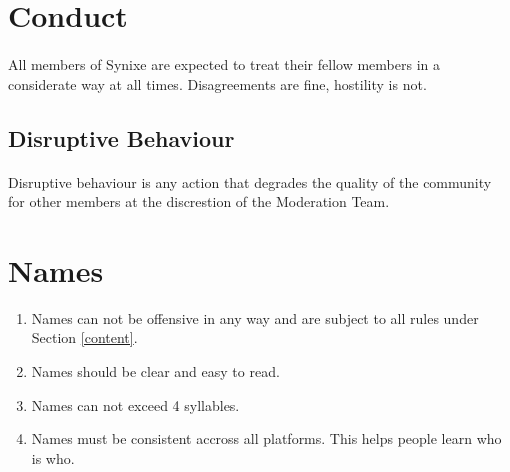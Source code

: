 \documentclass[10pt,a4paper]{article}
\begin{document}
\section{Conduct}
\paragraph{}
All members of Synixe are expected to treat their fellow members in a considerate way at all times. Disagreements are fine, hostility is not.
\subsection{Disruptive Behaviour}
\paragraph{}
Disruptive behaviour is any action that degrades the quality of the community for other members at the discrestion of the Moderation Team.
\section{Names}
\begin{enumerate}
	\item Names can not be offensive in any way and are subject to all rules under Section \ref{content}.
	\item Names should be clear and easy to read.
	\item Names can not exceed 4 syllables.
	\item Names must be consistent accross all platforms. This helps people learn who is who.
\end{enumerate}
\end{document}
